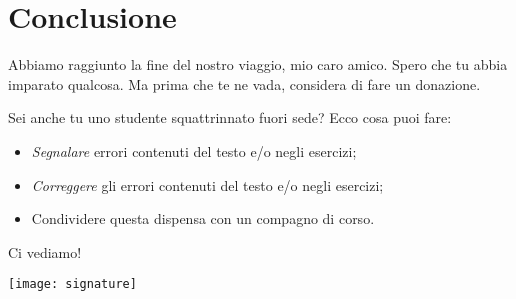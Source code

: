 \section*{Conclusione}

Abbiamo raggiunto la fine del nostro viaggio, mio caro amico. Spero che tu abbia imparato qualcosa. Ma prima che te ne vada, considera di fare un donazione.

\medskip
Sei anche tu uno studente squattrinnato fuori sede? Ecco cosa puoi fare:

\begin{itemize}
	\item \emph{Segnalare} errori contenuti del testo e/o negli esercizi;
	\item \emph{Correggere} gli errori contenuti del testo e/o negli esercizi;
	\item Condividere questa dispensa con un compagno di corso.
\end{itemize}

Ci vediamo!

\texttt{[image: signature]}
